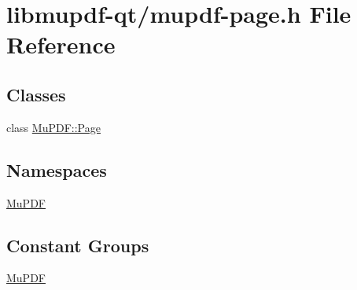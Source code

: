 \hypertarget{mupdf-page_8h}{\section{libmupdf-\/qt/mupdf-\/page.h File Reference}
\label{mupdf-page_8h}
}
\subsection*{Classes}
\begin{DoxyCompactItemize}
\item 
class \hyperlink{class_mu_p_d_f_1_1_page}{Mu\-P\-D\-F\-::\-Page}
\end{DoxyCompactItemize}
\subsection*{Namespaces}
\begin{DoxyCompactItemize}
\item 
\hyperlink{namespace_mu_p_d_f}{Mu\-P\-D\-F}
\end{DoxyCompactItemize}
\subsection*{Constant Groups}
\begin{DoxyCompactItemize}
\item 
\hyperlink{namespace_mu_p_d_f}{Mu\-P\-D\-F}
\end{DoxyCompactItemize}
